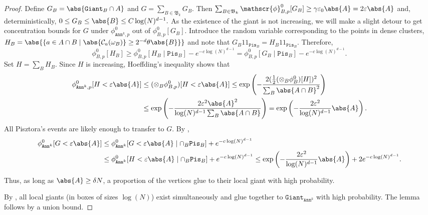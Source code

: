 \documentclass[article,11pt,reqno]{amsart}
\newcommand{\id}{1\! \!1}
\newcommand{\Giant}{\mathtt{Giant}}
\newcommand{\ak}{\mathtt{Ann}^k}
\newcommand{\Pis}{\mathtt{Pis}}
\begin{document}
\begin{appendix}
\begin{proof}
 Define $G_B =\abs{ \mathtt{Giant}_B  \cap A}$ and $G = \sum_{B \in \mathfrak{B}_k}G_B$. Then $\sum_{B \in \mathfrak{B}_k}\mathscr{\phi}^0_{B,p}[G_B] \geq \gamma \varepsilon_0 \abs{A} =2 \varepsilon\abs{A}$ and, deterministically, $0 \leq G_B \leq \abs{B} \leq C\log(N)^{d-1}.$ %
As the existence of the giant is not increasing, we will make a slight detour to get concentration bounds for $G$ under $\phi^0_{\ak,p}$ out of $\mathscr{\phi}^0_{B,p}[G_B]$. Introduce the random variable corresponding to the points in dense clusters, $H_B = \abs{\{a \in A\cap B \mid \abs{\mathcal{C}_a(\omega_B)}\geq 2^{-d} \theta \abs{B} \}}  $ and note that $G_B \id_{\Pis_B} =H_B \id_{\Pis_B}$. Therefore,
$$
\phi_{B,p}^0[H_B] \geq \phi_{B,p}^0[H_B \mid \Pis_B] - e^{-c \log(N)^{d-1}} =  \phi_{B,p}^0[G_B \mid \Pis_B] - e^{-c \log(N)^{d-1}}.
$$
Set $H= \sum_{B}H_B.$ Since $H$ is increasing, Hoeffding's inequality shows that
\begin{align*}
\phi_{\ak,p}^0[H < \varepsilon\abs{A}] &\leq (\otimes_{B} \phi_{B,p}^0)[H < \varepsilon\abs{A}] \leq   \exp \left( - \frac{2 (\frac{1}{2}(\otimes_{B} \phi_{B}^0)[H])^2}{\sum_{B} \abs{A\cap B}^2} \right) \\
&\leq  \exp\left( - \frac{2 \varepsilon^2\abs{A}^2}{\log(N)^{d-1}\sum_{B}\abs{A\cap B}} \right) 
= \exp\left( - \frac{2 \varepsilon^2}{\log(N)^{d-1}} \abs{A}\right).  
\end{align*}
All Pisztora's events are likely enough to transfer to $G$. By , 
\begin{align*}
\phi_{\ak}^0[G<\varepsilon\abs{A}] 
&\leq \phi_{\ak}^0[G<\varepsilon\abs{A} \mid \cap_B\Pis_B]  +e^{-c \log(N)^{d-1}}\\ 
&\leq \phi_{\ak}^0[H<\varepsilon\abs{A} \mid \cap_B\Pis_B] +e^{-c \log(N)^{d-1}}
\leq \exp\left( - \frac{2 \varepsilon^2}{\log(N)^{d-1}} \abs{A}\right) + 2e^{-c \log(N)^{d-1}}.
\end{align*}


Thus, as long as $\abs{A} \geq \delta N$, a proportion of the vertices glue to their local giant with high probability. 


By , all local giants (in boxes of sizes $\log(N)$) exist simultaneously and glue together to $\Giant_{\ak}$  with high probability.  The lemma follows by a union bound. 
\end{proof}


\end{appendix}
\end{document}
